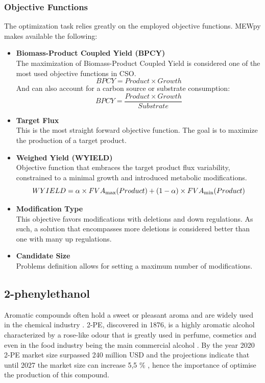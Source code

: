 \documentclass[runningheads]{llncs}
\begin{document}
\subsubsection{Objective Functions}
The optimization task relies greatly on the employed objective functions. MEWpy makes available the following:
\begin{itemize}
    \item[\ding{227}] \textbf{Biomass-Product Coupled Yield (BPCY)} \\
    The maximization of Biomass-Product Coupled Yield is considered one of the most used objective functions in CSO.
    \begin{equation}
        BPCY = Product \times Growth
    \end{equation}
    And can also account for a carbon source or substrate consumption:
    \begin{equation}
        BPCY = \frac{Product \times Growth}{Substrate}
    \end{equation}
    \item[\ding{227}] \textbf{Target Flux} \\
    This is the most straight forward objective function. The goal is to maximize the production of a target product.
    \item[\ding{227}] \textbf{Weighed Yield (WYIELD)} \\
    Objective function that embraces the target product flux variability, constrained to a minimal growth and introduced metabolic modifications.
    \begin{equation}
        WYIELD = \alpha \times FVA\textsubscript{max}(Product) + (1 - \alpha) \times FVA\textsubscript{min}(Product)
    \end{equation}
    \item[\ding{227}] \textbf{Modification Type} \\
    This objective favors modifications with deletions and down regulations. As such, a solution that encompasses more deletions is considered better than one with many up regulations.
    \item[\ding{227}] \textbf{Candidate Size} \\
    Problems definition allows for setting a maximum number of modifications.
\end{itemize}

\subsection{2-phenylethanol}
Aromatic compounds often hold a sweet or pleasant aroma and are widely used in the chemical industry \cite{aromaticcoumounds}. 2-PE, discovered in 1876, is a highly aromatic alcohol characterized by a rose-like odour that is greatly used in perfume, cosmetics and even in the food industry being the main commercial alcohol \cite{fabre1998phenylethyl,etschmann2002biotechnological}. By the year 2020 2-PE market size surpassed 240 million USD and the projections indicate that until 2027 the market size can increase 5,5 \% \cite{globalmarketinsightsinc}, hence the importance of optimise the production of this compound.
\end{document}
